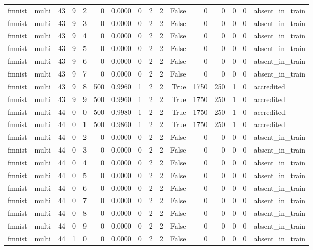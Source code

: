 \begin{tabular}{llrrrrrrrrrrrrrl}
fmnist & multi & 43 & 9 & 2 & 0 & 0.0000 & 0 & 2 & 2 & False & 0 & 0 & 0 & 0 & absent\_in\_train \\
fmnist & multi & 43 & 9 & 3 & 0 & 0.0000 & 0 & 2 & 2 & False & 0 & 0 & 0 & 0 & absent\_in\_train \\
fmnist & multi & 43 & 9 & 4 & 0 & 0.0000 & 0 & 2 & 2 & False & 0 & 0 & 0 & 0 & absent\_in\_train \\
fmnist & multi & 43 & 9 & 5 & 0 & 0.0000 & 0 & 2 & 2 & False & 0 & 0 & 0 & 0 & absent\_in\_train \\
fmnist & multi & 43 & 9 & 6 & 0 & 0.0000 & 0 & 2 & 2 & False & 0 & 0 & 0 & 0 & absent\_in\_train \\
fmnist & multi & 43 & 9 & 7 & 0 & 0.0000 & 0 & 2 & 2 & False & 0 & 0 & 0 & 0 & absent\_in\_train \\
fmnist & multi & 43 & 9 & 8 & 500 & 0.9960 & 1 & 2 & 2 & True & 1750 & 250 & 1 & 0 & accredited \\
fmnist & multi & 43 & 9 & 9 & 500 & 0.9960 & 1 & 2 & 2 & True & 1750 & 250 & 1 & 0 & accredited \\
fmnist & multi & 44 & 0 & 0 & 500 & 0.9980 & 1 & 2 & 2 & True & 1750 & 250 & 1 & 0 & accredited \\
fmnist & multi & 44 & 0 & 1 & 500 & 0.9860 & 1 & 2 & 2 & True & 1750 & 250 & 1 & 0 & accredited \\
fmnist & multi & 44 & 0 & 2 & 0 & 0.0000 & 0 & 2 & 2 & False & 0 & 0 & 0 & 0 & absent\_in\_train \\
fmnist & multi & 44 & 0 & 3 & 0 & 0.0000 & 0 & 2 & 2 & False & 0 & 0 & 0 & 0 & absent\_in\_train \\
fmnist & multi & 44 & 0 & 4 & 0 & 0.0000 & 0 & 2 & 2 & False & 0 & 0 & 0 & 0 & absent\_in\_train \\
fmnist & multi & 44 & 0 & 5 & 0 & 0.0000 & 0 & 2 & 2 & False & 0 & 0 & 0 & 0 & absent\_in\_train \\
fmnist & multi & 44 & 0 & 6 & 0 & 0.0000 & 0 & 2 & 2 & False & 0 & 0 & 0 & 0 & absent\_in\_train \\
fmnist & multi & 44 & 0 & 7 & 0 & 0.0000 & 0 & 2 & 2 & False & 0 & 0 & 0 & 0 & absent\_in\_train \\
fmnist & multi & 44 & 0 & 8 & 0 & 0.0000 & 0 & 2 & 2 & False & 0 & 0 & 0 & 0 & absent\_in\_train \\
fmnist & multi & 44 & 0 & 9 & 0 & 0.0000 & 0 & 2 & 2 & False & 0 & 0 & 0 & 0 & absent\_in\_train \\
fmnist & multi & 44 & 1 & 0 & 0 & 0.0000 & 0 & 2 & 2 & False & 0 & 0 & 0 & 0 & absent\_in\_train \\

\end{tabular}
